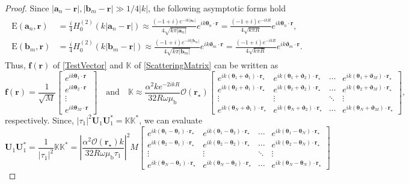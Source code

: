 \documentclass[3p,10pt]{elsarticle}
\newcommand{\mub}{\mu_\mathrm{b}}
\newcommand{\E}{\mathrm{E}}
\newcommand{\ma}{\mathbf{a}}
\newcommand{\mb}{\mathbf{b}}
\newcommand{\mf}{\mathbf{f}}
\newcommand{\mr}{\mathbf{r}}
\newcommand{\mU}{\mathbf{U}}
\newcommand{\vt}{\boldsymbol{\theta}}
\newcommand{\vv}{\boldsymbol{\vartheta}}
\theoremstyle{plain}
\theoremstyle{remark}
\begin{document}
\begin{proof}
Since $|\ma_n-\mr|,|\mb_m-\mr|\gg1/4|k|$, the following asymptotic forms hold
\begin{align}
\begin{aligned}\label{AsymptoticField}
\E(\ma_n,\mr)&=\frac{i}{4}H_0^{(2)}(k|\ma_n-\mr|)\approx\frac{(-1+i)e^{-ik|\ma_n|}}{4\sqrt{k\pi|\ma_n|}}e^{ik\vt_n\cdot\mr}=\frac{(-1+i)e^{-ikR}}{4\sqrt{k\pi R}}e^{ik\vt_n\cdot\mr},\\
\E(\mb_m,\mr)&=\frac{i}{4}H_0^{(2)}(k|\mb_m-\mr|)\approx\frac{(-1+i)e^{-ik|\mb_m|}}{4\sqrt{k\pi|\mb_m|}}e^{ik\vv_m\cdot\mr}=\frac{(-1+i)e^{-ikR}}{4\sqrt{k\pi R}}e^{ik\vv_m\cdot\mr}.
\end{aligned}
\end{align}
Thus, $\mf(\mr)$ of \eqref{TestVector} and $\mathbb{K}$ of \eqref{ScatteringMatrix} can be written as
\[\mf(\mr)=\frac{1}{\sqrt{M}}
\begin{bmatrix}
e^{ik\vt_1\cdot\mr}\\
e^{ik\vt_2\cdot\mr}\\
\vdots\\
e^{ik\vt_M\cdot\mr}
\end{bmatrix}\quad\text{and}\quad\mathbb{K}\approx\frac{\alpha^2ke^{-2ikR}}{32R\omega\mub}\mathcal{O}(\mr_\star)\begin{bmatrix}
e^{ik(\vt_1+\vv_1)\cdot\mr_\star} & e^{ik(\vt_1+\vv_2)\cdot\mr_\star} & \cdots & e^{ik(\vt_1+\vv_M)\cdot\mr_\star} \\
e^{ik(\vt_2+\vv_1)\cdot\mr_\star} & e^{ik(\vt_2+\vv_2)\cdot\mr_\star} & \cdots & e^{ik(\vt_2+\vv_M)\cdot\mr_\star} \\
\vdots & \vdots & \ddots & \vdots \\
e^{ik(\vt_N+\vv_1)\cdot\mr_\star} & e^{ik(\vt_N+\vv_2)\cdot\mr_\star} & \cdots & e^{ik(\vt_N+\vv_M)\cdot\mr_\star}
\end{bmatrix},\]
respectively. Since, $|\tau_1|^2\mU_1\mU_1^*=\mathbb{KK}^*$, we can evaluate
\[\mU_1\mU_1^*=\frac{1}{|\tau_1|^2}\mathbb{KK}^*=\left|\frac{\alpha^2\mathcal{O}(\mr_\star)k}{32R\omega\mub\tau_1}\right|^2M\begin{bmatrix}
e^{ik(\vt_1-\vt_1)\cdot\mr_\star} & e^{ik(\vt_1-\vt_2)\cdot\mr_\star} & \cdots & e^{ik(\vt_1-\vt_N)\cdot\mr_\star} \\
e^{ik(\vt_2-\vt_1)\cdot\mr_\star} & e^{ik(\vt_2-\vt_2)\cdot\mr_\star} & \cdots & e^{ik(\vt_2-\vt_N)\cdot\mr_\star} \\
\vdots & \vdots & \ddots & \vdots \\
e^{ik(\vt_N-\vt_1)\cdot\mr_\star} & e^{ik(\vt_N-\vt_2)\cdot\mr_\star} & \cdots & e^{ik(\vt_N-\vt_N)\cdot\mr_\star}

\end{bmatrix}\]
\end{proof}
\end{document}
